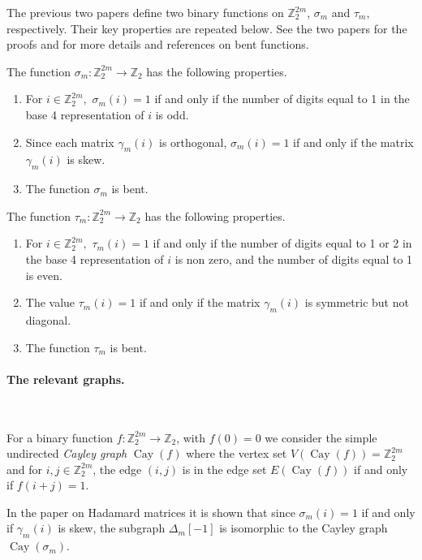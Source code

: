 \documentclass[12pt,a4paper]{article}
\newcommand{\mb}[1]{\mathbb{#1}}
\newcommand{\Cay}{\operatorname{Cay}}
\newcommand{\Z}{\mb{Z}}
\newcommand{\To}{\rightarrow}
\begin{document}
The previous two papers \cite{Leo14Constructions,Leo15Twin}
define two binary functions  on $\Z_2^{2 m}$, $\sigma_m$ and $\tau_m$, respectively.
Their key properties are repeated below.
See the two papers for the proofs and for more details and references on bent functions.

The function $\sigma_m : \Z_2^{2 m} \To \Z_2$ has the following properties.
\begin{enumerate}
 \item
For $i \in \Z_2^{2m},$ $\sigma_m(i) = 1$ if and only if the number of
digits equal to 1 in  the base 4 representation of $i$ is odd.
 \item
Since each matrix $\gamma_m(i)$ is orthogonal, $\sigma_m(i) = 1$ if and only if the matrix $\gamma_m(i)$ is skew.
 \item
The function $\sigma_m$ is bent.
\end{enumerate}

The function $\tau_m : \Z_2^{2 m} \To \Z_2$ has the following properties.
\begin{enumerate}
 \item
For $i \in \Z_2^{2m},$ $\tau_m(i) = 1$ if and only if the number of digits equal to 1 or 2 in the base 4
representation of $i$ is non zero, and the number of digits equal to 1 is even.
 \item
The value $\tau_m(i) = 1$ if and only if the matrix $\gamma_m(i)$ is symmetric but not diagonal.
 \item
The function $\tau_m$ is bent.
\end{enumerate}

\paragraph*{The relevant graphs.}
\label{sec-Graphs}

~

For a binary function $f : \Z_2^{2 m} \To \Z_2$, with $f(0)=0$ we consider the simple undirected \emph{Cayley graph} $\Cay(f)$  \cite[3.1]{BerC99}
where the vertex set $V(\Cay(f)) = \Z_2^{2 m}$ and for $i,j \in \Z_2^{2 m}$, the edge $(i,j)$ is in the edge set $E(\Cay(f))$ if and only if $f(i+j)=1$.

In the paper on Hada\-mard matrices \cite{Leo14Constructions} it is shown that
since $\sigma_m(i)=1$ if and only if $\gamma_m(i)$ is skew,
the subgraph $\varDelta_m[-1]$ is isomorphic to the Cayley graph $\Cay(\sigma_m)$.
\end{document}
